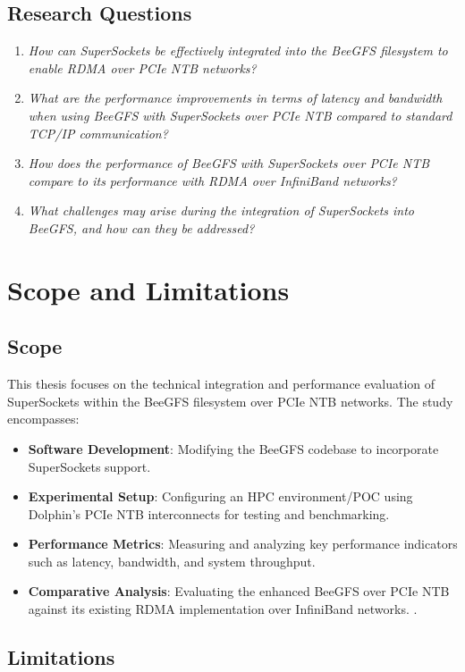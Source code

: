 \subsection{Research Questions}
\begin{enumerate}
    \item \textit{How can SuperSockets be effectively integrated into the BeeGFS filesystem to enable RDMA over PCIe NTB networks?}
    \item \textit{What are the performance improvements in terms of latency and bandwidth when using BeeGFS with SuperSockets over PCIe NTB compared to standard TCP/IP communication?}
    \item \textit{How does the performance of BeeGFS with SuperSockets over PCIe NTB compare to its performance with RDMA over InfiniBand networks?}
    \item \textit{What challenges may arise during the integration of SuperSockets into BeeGFS, and how can they be addressed?}

\end{enumerate}

\section{Scope and Limitations}
\subsection{Scope}
This thesis focuses on the technical integration and performance evaluation of SuperSockets within the BeeGFS filesystem over PCIe NTB networks. The study encompasses:
\begin{itemize}
    \item \textbf{Software Development}: Modifying the BeeGFS codebase to incorporate SuperSockets support.
    \item \textbf{Experimental Setup}: Configuring an HPC environment/POC using Dolphin's PCIe NTB interconnects for testing and benchmarking.
    \item \textbf{Performance Metrics}: Measuring and analyzing key performance indicators such as latency, bandwidth, and system throughput.
    \item \textbf{Comparative Analysis}: Evaluating the enhanced BeeGFS over PCIe NTB against its existing RDMA implementation over InfiniBand networks.
.
\end{itemize}

\subsection{Limitations}

